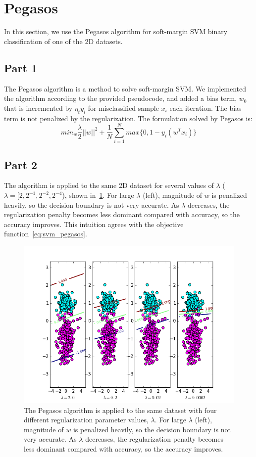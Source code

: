 \section{Pegasos} \label{sec:prob3}
In this section, we use the Pegasos algorithm for soft-margin SVM binary classification of one of the 2D datasets.

\subsection{Part 1}
The Pegasos algorithm is a method to solve soft-margin SVM.
We implemented the algorithm according to the provided pseudocode, and added a bias term, $w_0$ that is incremented by $\eta_ty_i$ for misclassified sample $x_i$ each iteration.
The bias term is not penalized by the regularization.
The formulation solved by Pegasos is:
\begin{equation}\label{eq:svm_pegasos}
min_w \frac{\lambda}{2}||w||^2 + \frac{1}{N}\sum\limits_{i=1}^{N}max\{0,1-y_i(w^Tx_i)\}
\end{equation}

\subsection{Part 2}
The algorithm is applied to the same 2D dataset for several values of $\lambda$ ($\lambda = [2, 2^{-1}, 2^{-2}, 2^{-4}$), shown in~\cref{fig:3_2_lambdas}.
For large $\lambda$ (left), magnitude of $w$ is penalized heavily, so the decision boundary is not very accurate.
As $\lambda$ decreases, the regularization penalty becomes less dominant compared with accuracy, so the accuracy improves.
This intuition agrees with the objective function~\cref{eq:svm_pegasos}.

\begin{figure}
	\centering
	\includegraphics [trim=0 0 0 0, clip, angle=0, width=0.8\columnwidth,
	keepaspectratio]{figures/3_2_lambdas}
	\caption{The Pegasos algorithm is applied to the same dataset with four different regularization parameter values, $\lambda$. For large $\lambda$ (left), magnitude of $w$ is penalized heavily, so the decision boundary is not very accurate. As $\lambda$ decreases, the regularization penalty becomes less dominant compared with accuracy, so the accuracy improves.}
	\label{fig:3_2_lambdas} 
\end{figure}

